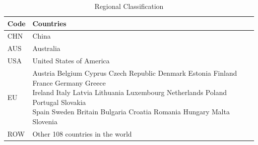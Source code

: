 \documentclass[AER]{AEA}
\begin{document}
\begin{table}[!htb]
\centering
\caption{Regional Classification}
\def\theadset{\def\arraytretch{1.5}}
\def\arraystretch{1.2}
\small
\begin{tabular}{ll}
\hline\hline
 Code & Countries \\
\hline
 CHN & China \\
 AUS & Australia \\
 USA & United States of America \\
 EU  & \makecell[l]{Austria Belgium Cyprus Czech Republic Denmark
                Estonia Finland France Germany Greece \\
                Ireland Italy Latvia Lithuania Luxembourg 
                Netherlands Poland Portugal Slovakia \\
                Spain Sweden Britain Bulgaria Croatia Romania
                Hungary Malta Slovenia }\\
 ROW & Other 108 countries in the world \\
\hline\hline
\end{tabular}
\end{table}
\end{document}
